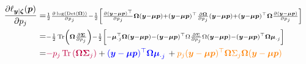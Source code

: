 \documentclass[pdflatex, sn-nature]{sn-jnl}
\theoremstyle{thmstyleone}%
\theoremstyle{thmstyletwo}%
\theoremstyle{thmstylethree}%
\begin{document}
    \begin{equation}
        \label{eq-derivative-log-likelihood-unconstrained}
        \begin{split}
            \frac{\partial \ell_{\boldsymbol{y} | \boldsymbol{\zeta}}(\boldsymbol{p})}{\partial
            p_{j}}=&\scriptstyle \frac{1}{2}\frac{\partial \log\left(\operatorname*{Det}(\boldsymbol{\Omega})\right)}{\partial
            p_{j}}-\frac{1}{2}\left[\frac{\partial (\boldsymbol{y}- \boldsymbol{\mu}\boldsymbol{p})^{\top}}{\partial
            p_{j}}\boldsymbol{\Omega}(\boldsymbol{y}- \boldsymbol{\mu}\boldsymbol
            {p}) + (\boldsymbol{y}- \boldsymbol{\mu}\boldsymbol{p})^{\top}\frac{\partial\boldsymbol{\Omega}}{\partial
            p_{j}}(\boldsymbol{y}- \boldsymbol{\mu}\boldsymbol{p}) + (\boldsymbol
            {y}- \boldsymbol{\mu}\boldsymbol{p})^{\top}\boldsymbol{\Omega}\frac{\partial
            (\boldsymbol{y} - \boldsymbol{\mu} \boldsymbol{p})}{\partial p_{j}}\right
            ]\\
            =&\scriptstyle -\frac{1}{2}\operatorname*{Tr} \left(\boldsymbol{\Omega}\frac{\partial
            \boldsymbol{\Sigma}}{\partial p_{j}}\right) - \frac{1}{2}\left[ - \boldsymbol
            {\mu}_{\cdot j}^{\top}\boldsymbol{\Omega}(\boldsymbol{y}- \boldsymbol{\mu}
            \boldsymbol{p}) - (\boldsymbol{y}- \boldsymbol{\mu}\boldsymbol{p})^{\top}
            \Omega\frac{\partial \Sigma}{\partial p_{j}}\Omega(\boldsymbol{y}- \boldsymbol
            {\mu}\boldsymbol{p}) - (\boldsymbol{y}- \boldsymbol{\mu}\boldsymbol{p}
            )^{\top}\boldsymbol{\Omega}\boldsymbol{\mu}_{\cdot j}\right] \\
            =&\textcolor{purple}{-p_j \operatorname*{Tr} \left(\boldsymbol{\Omega}\boldsymbol{\Sigma}_j\right)
            }+ \textcolor{blue}{(\boldsymbol{y} - \boldsymbol{\mu} \boldsymbol{p})^\top\boldsymbol{\Omega}
            \boldsymbol{\mu}_{\cdot j}}\, + \textcolor{orange}{p_j (\boldsymbol{y} -
            \boldsymbol{\mu} \boldsymbol{p})^\top\boldsymbol{\Omega} \Sigma_j
            \boldsymbol{\Omega} (\boldsymbol{y} - \boldsymbol{\mu} \boldsymbol{p})
            }
        \end{split}
    \end{equation}
\end{document}
